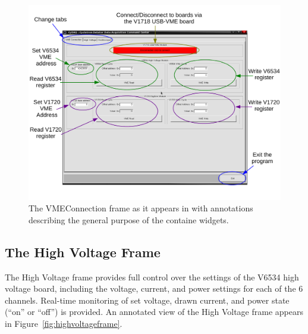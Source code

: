 \begin{figure}[b]
  \centering
  \caption{The VMEConnection frame as it appears in
    \ADAQ with annotations describing the general
    purpose of the containe widgets.}
  \label{fig:vmeconnectionframe}
  \includegraphics[width=6in]{figures/VMEConnectionFrame}
\end{figure}

\subsection{The High Voltage Frame}
The High Voltage frame provides full control over the settings of the
V6534 high voltage board, including the voltage, current, and power
settings for each of the 6 channels. Real-time monitoring of set
voltage, drawn current, and power state (``on'' or ``off'') is
provided. An annotated view of the High Voltage frame appears in
Figure~\ref{fig:highvoltageframe}.

